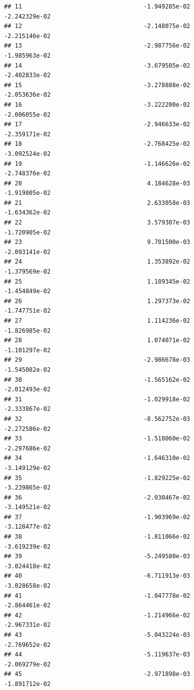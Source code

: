 \documentclass[
]{article}
\begin{document}
\begin{verbatim}
## 11                                  -1.949285e-02          -2.242329e-02
## 12                                  -2.148075e-02          -2.215146e-02
## 13                                  -2.987756e-02          -1.985963e-02
## 14                                  -3.679505e-02          -2.402833e-02
## 15                                  -3.278888e-02          -2.053636e-02
## 16                                  -3.222200e-02          -2.006055e-02
## 17                                  -2.946633e-02          -2.359171e-02
## 18                                  -2.768425e-02          -3.092524e-02
## 19                                  -1.146626e-02          -2.748376e-02
## 20                                   4.184628e-03          -1.919805e-02
## 21                                   2.633058e-03          -1.634362e-02
## 22                                   3.579307e-03          -1.720905e-02
## 23                                   9.701500e-03          -2.093141e-02
## 24                                   1.353892e-02          -1.379569e-02
## 25                                   1.189345e-02          -1.454849e-02
## 26                                   1.297373e-02          -1.747751e-02
## 27                                   1.114236e-02          -1.826985e-02
## 28                                   1.074071e-02          -1.101297e-02
## 29                                  -2.986678e-03          -1.545082e-02
## 30                                  -1.565162e-02          -2.012493e-02
## 31                                  -1.029918e-02          -2.333867e-02
## 32                                  -8.562752e-03          -2.272586e-02
## 33                                  -1.518060e-02          -2.297686e-02
## 34                                  -1.646310e-02          -3.149129e-02
## 35                                  -1.829225e-02          -3.239865e-02
## 36                                  -2.030467e-02          -3.149521e-02
## 37                                  -1.903969e-02          -3.128477e-02
## 38                                  -1.811066e-02          -3.619239e-02
## 39                                  -5.249580e-03          -3.024418e-02
## 40                                  -6.711913e-03          -3.028658e-02
## 41                                  -1.047778e-02          -2.864461e-02
## 42                                  -1.214966e-02          -2.967331e-02
## 43                                  -5.043224e-03          -2.769652e-02
## 44                                  -5.119637e-03          -2.069279e-02
## 45                                  -2.971898e-03          -1.891712e-02

\end{verbatim}
\end{document}
